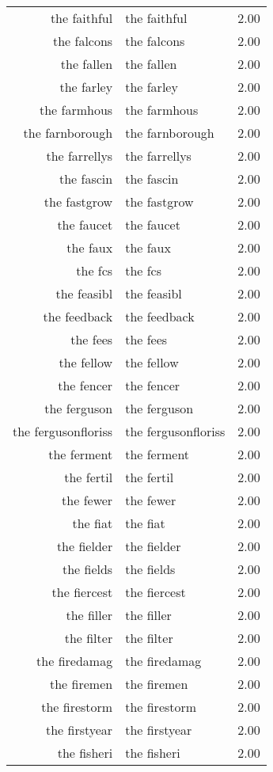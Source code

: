 \begin{table}[ht]
\begin{tabular}{rlr}
  the faithful & the faithful & 2.00 \\ 
  the falcons & the falcons & 2.00 \\ 
  the fallen & the fallen & 2.00 \\ 
  the farley & the farley & 2.00 \\ 
  the farmhous & the farmhous & 2.00 \\ 
  the farnborough & the farnborough & 2.00 \\ 
  the farrellys & the farrellys & 2.00 \\ 
  the fascin & the fascin & 2.00 \\ 
  the fastgrow & the fastgrow & 2.00 \\ 
  the faucet & the faucet & 2.00 \\ 
  the faux & the faux & 2.00 \\ 
  the fcs & the fcs & 2.00 \\ 
  the feasibl & the feasibl & 2.00 \\ 
  the feedback & the feedback & 2.00 \\ 
  the fees & the fees & 2.00 \\ 
  the fellow & the fellow & 2.00 \\ 
  the fencer & the fencer & 2.00 \\ 
  the ferguson & the ferguson & 2.00 \\ 
  the fergusonfloriss & the fergusonfloriss & 2.00 \\ 
  the ferment & the ferment & 2.00 \\ 
  the fertil & the fertil & 2.00 \\ 
  the fewer & the fewer & 2.00 \\ 
  the fiat & the fiat & 2.00 \\ 
  the fielder & the fielder & 2.00 \\ 
  the fields & the fields & 2.00 \\ 
  the fiercest & the fiercest & 2.00 \\ 
  the filler & the filler & 2.00 \\ 
  the filter & the filter & 2.00 \\ 
  the firedamag & the firedamag & 2.00 \\ 
  the firemen & the firemen & 2.00 \\ 
  the firestorm & the firestorm & 2.00 \\ 
  the firstyear & the firstyear & 2.00 \\ 
  the fisheri & the fisheri & 2.00 \\ 

\end{tabular}
\end{table}
